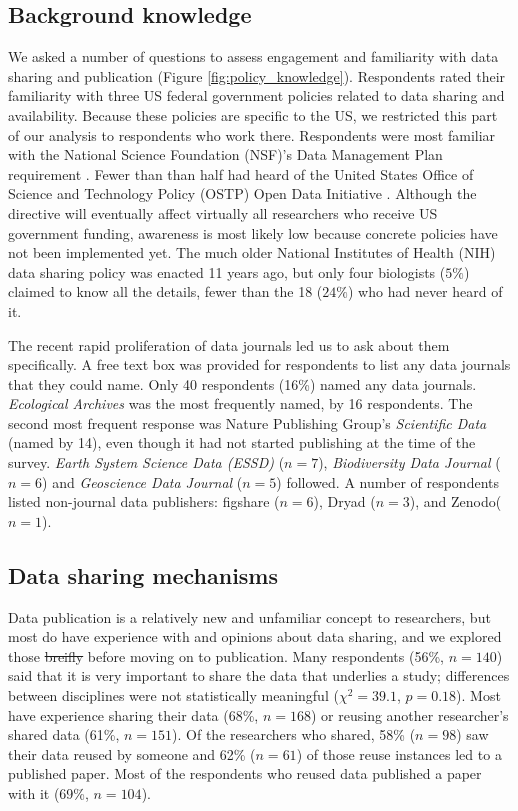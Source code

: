 \documentclass[10pt]{article}
\providecommand{\DIFaddtex}[1]{{\protect\color{blue}\uwave{#1}}} %
\providecommand{\DIFdeltex}[1]{{\protect\color{red}\sout{#1}}}                      %
\providecommand{\DIFaddbegin}{} %
\providecommand{\DIFaddend}{} %
\providecommand{\DIFdelbegin}{} %
\providecommand{\DIFdelend}{} %
\providecommand{\DIFadd}[1]{\texorpdfstring{\DIFaddtex{#1}}{#1}} %
\providecommand{\DIFdel}[1]{\texorpdfstring{\DIFdeltex{#1}}{}} %
\begin{document}
\subsection*{Background knowledge}

We asked a number of questions to assess engagement and familiarity with data sharing and publication (Figure \ref{fig:policy_knowledge}).
Respondents rated their familiarity with three US federal government policies related to data sharing and availability.
Because these policies are specific to the US, we restricted this part of our analysis to respondents who work there.
Respondents were most familiar with the National Science Foundation (NSF)'s Data Management Plan requirement \cite{national_science_foundation_gpg_2011}.
Fewer than than half had heard of the United States Office of Science and Technology Policy (OSTP) Open Data Initiative \cite{obama_making_2013}. 
Although the directive will eventually affect virtually all researchers who receive US government funding, awareness is most likely low because concrete policies have not been implemented yet. 
The much older National Institutes of Health (NIH) data sharing policy \cite{national_institutes_of_health_final_2003} was enacted 11 years ago, but only four biologists ($5\%$) claimed to know all the details, fewer than the 18 ($24\%$) who had never heard of it.

The recent rapid proliferation of data journals led us to ask about them specifically.
A free text box was provided for respondents to list any data journals that they could name.
Only 40 respondents (16\%) named any data journals. 
\emph{Ecological Archives} was the most frequently named, by 16 respondents. 
The second most frequent response was Nature Publishing Group's \emph{Scientific Data} (named by 14), even though it had not started publishing at the time of the survey.
\emph{Earth System Science Data (ESSD)} ($n=7$), \emph{Biodiversity Data Journal} ($n=6$) and \emph{Geoscience Data Journal} ($n=5$) followed.
A number of respondents listed non-journal data publishers: figshare ($n=6$), Dryad ($n=3$), and Zenodo($n=1$).

\subsection*{Data sharing mechanisms}

Data publication is a relatively new and unfamiliar concept to researchers, but most do have experience with and opinions about data sharing, and we explored those \DIFdelbegin \DIFdel{breifly }\DIFdelend \DIFaddbegin \DIFadd{briefly }\DIFaddend before moving on to publication.
Many respondents (56\%, $n=140$) said that it is very important to share the data that underlies a study; differences between disciplines were not statistically meaningful ($\chi^{2}=39.1$, $p= 0.18$).
Most have experience sharing their data (68\%, $n=168$) or reusing another researcher's shared data (61\%, $n=151$).
Of the researchers who shared, 58\% ($n=98$) saw their data reused by someone and 62\% ($n=61$) of those reuse instances led to a published paper.
Most of the respondents who reused data published a paper with it (69\%, $n=104$).
\end{document}
